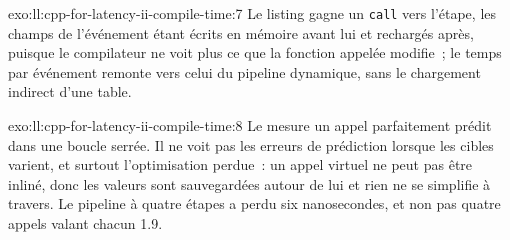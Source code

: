 \begin{solution}{exo:ll:cpp-for-latency-ii-compile-time:7}
Le listing gagne un \texttt{call} vers l'étape, les champs de l'événement étant écrits en mémoire avant lui et rechargés après, puisque
le compilateur ne voit plus ce que la fonction appelée modifie~; le temps par événement remonte vers celui du pipeline dynamique, sans le
chargement indirect d'une table.
\end{solution}

\begin{solution}{exo:ll:cpp-for-latency-ii-compile-time:8}
Le  mesure un appel parfaitement prédit dans une boucle serrée. Il ne voit pas les erreurs de prédiction lorsque les cibles varient, et
surtout l'optimisation perdue~: un appel virtuel ne peut pas être inliné, donc les valeurs sont sauvegardées autour de lui et rien ne se simplifie
à travers. Le pipeline à quatre étapes a perdu six nanosecondes, et non pas quatre appels valant chacun 1.9.
\end{solution}


